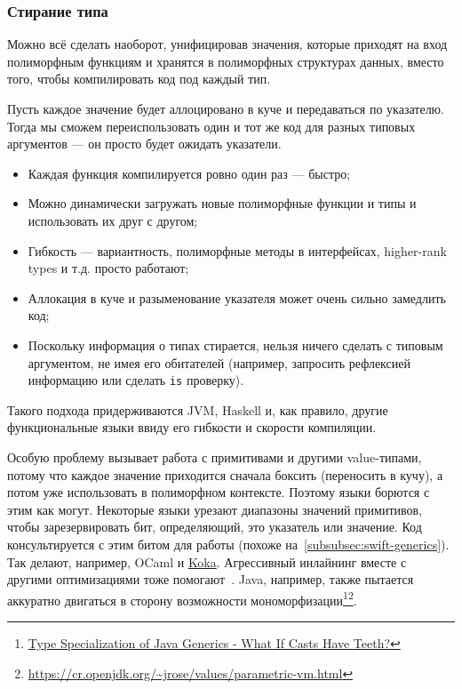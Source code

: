 
\subsubsection{Стирание типа} \label{subsubsec:type-erasure}

Можно всё сделать наоборот, унифицировав значения, которые приходят на вход полиморфным функциям и хранятся в полиморфных структурах данных, вместо того, чтобы компилировать код под каждый тип.

Пусть каждое значение будет аллоцировано в куче и передаваться по указателю.
Тогда мы сможем переиспользовать один и тот же код для разных типовых аргументов --- он просто будет ожидать указатели.

\begin{itemize}
    \item[\positive] Каждая функция компилируется ровно один раз --- быстро;
    \item[\positive] Можно динамически загружать новые полиморфные функции и типы и использовать их друг с другом;
    \item[\positive] Гибкость --- вариантность, полиморфные методы в интерфейсах, higher-rank types и т.д. просто работают;
    \item[\negative] Аллокация в куче и разыменование указателя может очень сильно замедлить код;
    \item[\negative] Поскольку информация о типах стирается, нельзя ничего сделать с типовым аргументом, не имея его обитателей (например, запросить рефлексией информацию или сделать \texttt{is} проверку).
\end{itemize}

Такого подхода придерживаются JVM, Haskell и, как правило, другие функциональные языки ввиду его гибкости и скорости компиляции.

Особую проблему вызывает работа с примитивами и другими value-типами, потому что каждое значение приходится сначала боксить (переносить в кучу), а потом уже использовать в полиморфном контексте.
Поэтому языки борются с этим как могут.
Некоторые языки урезают диапазоны значений примитивов, чтобы зарезервировать бит, определяющий, это указатель или значение.
Код консультируется с этим битом для работы (похоже на~\ref{subsubsec:swift-generics}).
Так делают, например, OCaml и \href{https://koka-lang.github.io/koka/doc/book.html#sec-value-types}{Koka}.
Агрессивный инлайнинг вместе с другими оптимизациями тоже помогают~\cite{blanchet1999escape}.
Java, например, также пытается аккуратно двигаться в сторону возможности мономорфизации\footnote{\href{https://youtu.be/JI09cs2yUgY?si=MLkRs31mN1koXIu1}{Type Specialization of Java Generics - What If Casts Have Teeth?}}\footnote{\url{https://cr.openjdk.org/~jrose/values/parametric-vm.html}}.

